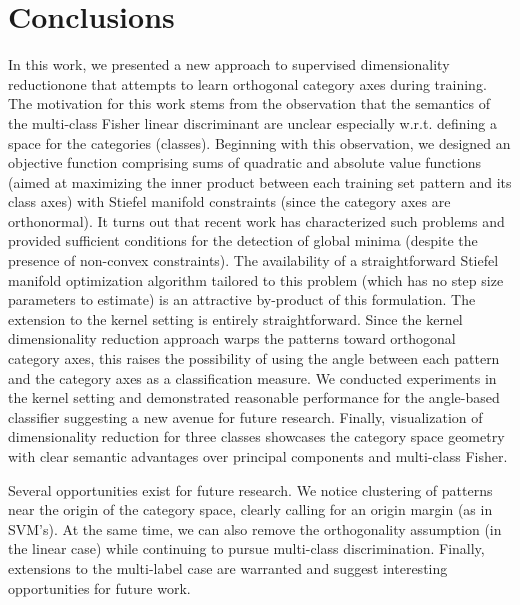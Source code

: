 
\section{Conclusions}

In this work, we presented a new approach to supervised dimensionality
reduction\textemdash one that attempts to learn orthogonal category
axes during training. The motivation for this work stems from the
observation that the semantics of the multi-class Fisher linear discriminant
are unclear especially w.r.t. defining a space for the categories
(classes). Beginning with this observation, we designed an objective
function comprising sums of quadratic and absolute value functions
(aimed at maximizing the inner product between each training set pattern
and its class axes) with Stiefel manifold constraints (since the category
axes are orthonormal). It turns out that recent work has characterized
such problems and provided sufficient conditions for the detection
of global minima (despite the presence of non-convex constraints).
The availability of a straightforward Stiefel manifold optimization
algorithm tailored to this problem (which has no step size parameters
to estimate) is an attractive by-product of this formulation. The
extension to the kernel setting is entirely straightforward. Since
the kernel dimensionality reduction approach warps the patterns toward
orthogonal category axes, this raises the possibility of using the
angle between each pattern and the category axes as a classification
measure. We conducted experiments in the kernel setting and demonstrated
reasonable performance for the angle-based classifier suggesting a
new avenue for future research. Finally, visualization of dimensionality
reduction for three classes showcases the category space geometry
with clear semantic advantages over principal components and multi-class
Fisher. 

Several opportunities exist for future research. We notice clustering
of patterns near the origin of the category space, clearly calling
for an origin margin (as in SVM's). At the same time, we can also
remove the orthogonality assumption (in the linear case) while continuing
to pursue multi-class discrimination. Finally, extensions to the multi-label
case \citep{sun2013multi} are warranted and suggest interesting opportunities
for future work.


